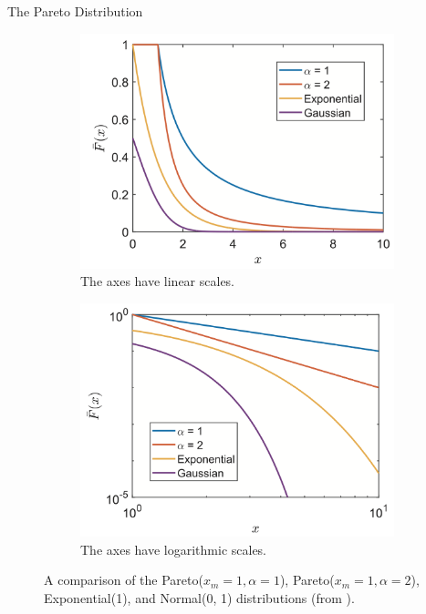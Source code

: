 \documentclass{beamer}
\begin{document}
\begin{frame}{The Pareto Distribution}
    \begin{figure}
        \begin{subfigure}{0.5\textwidth}
            \centering
            \includegraphics[width=\linewidth]{dist_tails.png}
            \caption{The axes have linear scales.}
        \end{subfigure}%
        \begin{subfigure}{0.5\textwidth}
            \centering
            \includegraphics[width=\linewidth]{log_log_dist_tails.png}
            \caption{The axes have logarithmic scales.}
        \end{subfigure}
        \caption{A comparison of the Pareto($x_m = 1, \alpha = 1$), Pareto($x_m = 1, \alpha = 2$), Exponential(1), and Normal(0, 1) distributions (from \cite{nair2022thef}).}
    \end{figure}
\end{frame}
\end{document}
